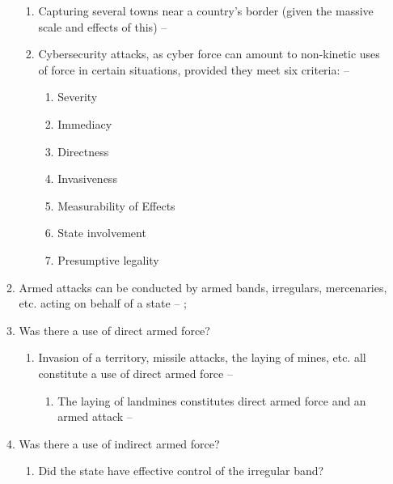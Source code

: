 \begin{enumerate}
\begin{enumerate}
\begin{enumerate}
            \item Capturing several towns near a country's border (given the massive scale and effects of this) -- 
            \item Cybersecurity attacks, as cyber force can amount to non-kinetic uses of force in certain situations, provided they meet six criteria: -- 
            \begin{enumerate}
                \item Severity
                \item Immediacy
                \item Directness
                \item Invasiveness
                \item Measurability of Effects
                \item State involvement
                \item Presumptive legality
            \end{enumerate}
        \end{enumerate}
        \item Armed attacks can be conducted by armed bands, irregulars, mercenaries, etc. acting on behalf of a state -- ; 
        \item Was there a use of direct armed force?
        \begin{enumerate}
            \item Invasion of a territory, missile attacks, the laying of mines, etc. all constitute a use of direct armed force -- 
            \begin{enumerate}
                \item The laying of landmines constitutes direct armed force and an armed attack -- 
            \end{enumerate}
        \end{enumerate}
        \item Was there a use of indirect armed force?
        \begin{enumerate}
            \item Did the state have effective control of the irregular band?
            \begin{enumerate}

\end{enumerate}
\end{enumerate}
\end{enumerate}
\end{enumerate}
